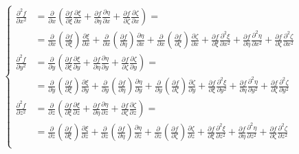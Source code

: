 \documentclass
[
a4paper,                      %
twoside,					  %
12pt,                         %
abstract,		      %
fleqn,                        %
]
{scrartcl} %
\begin{document}
\begin{description}
\begin{equation}
\begin{cases}
\frac{\partial^{2} f}{\partial x^{2}}&=\frac{\partial}{\partial x}\left(\frac{\partial f}{\partial\xi}\frac{\partial\xi}{\partial x}+\frac{\partial f}{\partial\eta}\frac{\partial\eta}{\partial x}+\frac{\partial f}{\partial\zeta}\frac{\partial\zeta}{\partial x}\right)=\\[5pt]
&=\frac{\partial}{\partial x}\left(\frac{\partial f}{\partial\xi}\right)\frac{\partial\xi}{\partial x}+\frac{\partial}{\partial x}\left(\frac{\partial f}{\partial\eta}\right)\frac{\partial\eta}{\partial x}+\frac{\partial}{\partial x}\left(\frac{\partial f}{\partial\zeta}\right)\frac{\partial\zeta}{\partial x}+\frac{\partial f}{\partial\xi}\frac{\partial^{2}\xi}{\partial x^{2}}+\frac{\partial f}{\partial\eta}\frac{\partial^{2}\eta}{\partial x^{2}}+\frac{\partial f}{\partial\zeta}\frac{\partial^{2}\zeta}{\partial x^{2}}\\[10pt]
%
\frac{\partial^{2} f}{\partial y^{2}}&=\frac{\partial}{\partial y}\left(\frac{\partial f}{\partial\xi}\frac{\partial\xi}{\partial y}+\frac{\partial f}{\partial\eta}\frac{\partial\eta}{\partial y}+\frac{\partial f}{\partial\zeta}\frac{\partial\zeta}{\partial y}\right)=\\[5pt]
&=\frac{\partial}{\partial y}\left(\frac{\partial f}{\partial\xi}\right)\frac{\partial\xi}{\partial y}+\frac{\partial}{\partial y}\left(\frac{\partial f}{\partial\eta}\right)\frac{\partial\eta}{\partial y}+\frac{\partial}{\partial y}\left(\frac{\partial f}{\partial\zeta}\right)\frac{\partial\zeta}{\partial y}+\frac{\partial f}{\partial\xi}\frac{\partial^{2}\xi}{\partial y^{2}}+\frac{\partial f}{\partial\eta}\frac{\partial^{2}\eta}{\partial y^{2}}+\frac{\partial f}{\partial\zeta}\frac{\partial^{2}\zeta}{\partial y^{2}}\\[10pt]
%
\frac{\partial^{2} f}{\partial z^{2}}&=\frac{\partial}{\partial z}\left(\frac{\partial f}{\partial\xi}\frac{\partial\xi}{\partial z}+\frac{\partial f}{\partial\eta}\frac{\partial\eta}{\partial z}+\frac{\partial f}{\partial\zeta}\frac{\partial\zeta}{\partial z}\right)=\\[5pt]
&=\frac{\partial}{\partial z}\left(\frac{\partial f}{\partial\xi}\right)\frac{\partial\xi}{\partial z}+\frac{\partial}{\partial z}\left(\frac{\partial f}{\partial\eta}\right)\frac{\partial\eta}{\partial z}+\frac{\partial}{\partial z}\left(\frac{\partial f}{\partial\zeta}\right)\frac{\partial\zeta}{\partial z}+\frac{\partial f}{\partial\xi}\frac{\partial^{2}\xi}{\partial z^{2}}+\frac{\partial f}{\partial\eta}\frac{\partial^{2}\eta}{\partial z^{2}}+\frac{\partial f}{\partial\zeta}\frac{\partial^{2}\zeta}{\partial z^{2}}\\[10pt]
\end{cases}
\end{equation}


\end{description}
\end{document}
